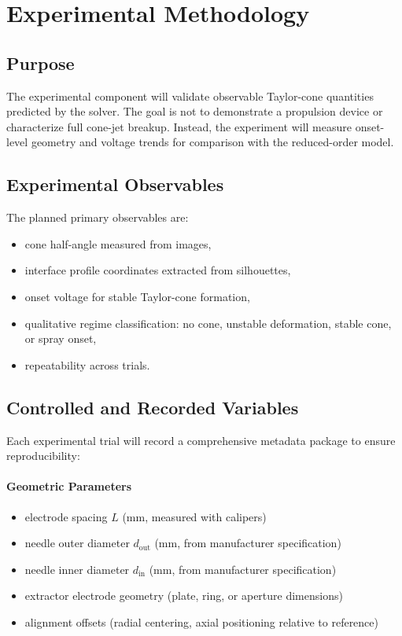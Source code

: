 \section{Experimental Methodology}

\subsection{Purpose}

The experimental component will validate observable Taylor-cone quantities predicted by the solver. The goal is not to demonstrate a propulsion device or characterize full cone-jet breakup. Instead, the experiment will measure onset-level geometry and voltage trends for comparison with the reduced-order model.

\subsection{Experimental Observables}

The planned primary observables are:
\begin{itemize}
    \item cone half-angle measured from images,
    \item interface profile coordinates extracted from silhouettes,
    \item onset voltage for stable Taylor-cone formation,
    \item qualitative regime classification: no cone, unstable deformation, stable cone, or spray onset,
    \item repeatability across trials.
\end{itemize}

\subsection{Controlled and Recorded Variables}

Each experimental trial will record a comprehensive metadata package to ensure reproducibility:

\paragraph{Geometric Parameters}
\begin{itemize}
    \item electrode spacing $L$ (mm, measured with calipers)
    \item needle outer diameter $d_{\mathrm{out}}$ (mm, from manufacturer specification)
    \item needle inner diameter $d_{\mathrm{in}}$ (mm, from manufacturer specification)
    \item extractor electrode geometry (plate, ring, or aperture dimensions)
    \item alignment offsets (radial centering, axial positioning relative to reference)
\end{itemize}

